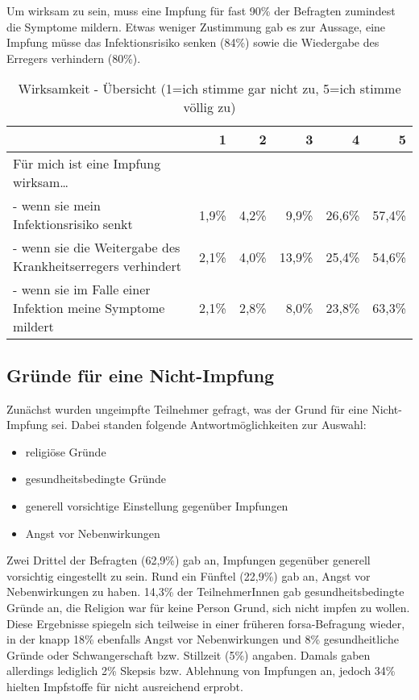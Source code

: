 Um wirksam zu sein, muss eine Impfung für fast 90\% der Befragten zumindest die Symptome mildern. Etwas weniger Zustimmung gab es zur Aussage, eine Impfung müsse das Infektionsrisiko senken (84\%) sowie die Wiedergabe des Erregers verhindern (80\%).

\begin{table}[h!]
    \centering
    \begin{tabular} {p{7.5cm} r r r r r}
        & 1 & 2 & 3 & 4 & 5 \\
        \hline
        Für mich ist eine Impfung wirksam\ldots & & & & & \\

        - wenn sie mein Infektionsrisiko senkt & 1,9\% & 4,2\% & 9,9\% & 26,6\% & 57,4\% \\

        - wenn sie die Weitergabe des Krankheitserregers verhindert & 2,1\% & 4,0\% & 13,9\% & 25,4\% & 54,6\% \\

        - wenn sie im Falle einer Infektion meine Symptome mildert & 2,1\% & 2,8\% & 8,0\% & 23,8\% & 63,3\% \\
    \end{tabular}
    \caption{Wirksamkeit - Übersicht (1=ich stimme gar nicht zu, 5=ich stimme völlig zu)}
    \label{tab:wirksamkeit}
\end{table}

\subsection{Gründe für eine Nicht-Impfung}

Zunächst wurden ungeimpfte Teilnehmer gefragt, was der Grund für eine Nicht-Impfung sei. Dabei standen folgende Antwortmöglichkeiten zur Auswahl:
\begin{itemize}
    \item religiöse Gründe
    \item gesundheitsbedingte Gründe
    \item generell vorsichtige Einstellung gegenüber Impfungen
    \item Angst vor Nebenwirkungen
\end{itemize}
Zwei Drittel der Befragten (62,9\%) gab an, Impfungen gegenüber generell vorsichtig eingestellt zu sein.
Rund ein Fünftel (22,9\%) gab an, Angst vor Nebenwirkungen zu haben.
14,3\% der TeilnehmerInnen gab gesundheitsbedingte Gründe an, die Religion war für keine Person Grund, sich nicht impfen zu wollen.
Diese Ergebnisse spiegeln sich teilweise in einer früheren forsa-Befragung wieder, in der knapp 18\% ebenfalls Angst vor Nebenwirkungen und 8\% gesundheitliche Gründe oder Schwangerschaft bzw. Stillzeit (5\%) angaben. Damals gaben allerdings lediglich 2\% Skepsis bzw. Ablehnung von Impfungen an, jedoch 34\% hielten Impfstoffe für nicht ausreichend erprobt. \cite{forsa-befragung}

